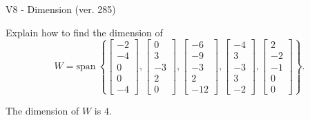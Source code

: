 \begin{exercise}
  \begin{exerciseTitle}V8 - Dimension (ver. 285)\end{exerciseTitle}
  \begin{exerciseStatement}
    Explain how to find the dimension of 
\[W=\mathrm{span}\ \left\{\left[\begin{array}{r}
-2 \\
-4 \\
0 \\
0 \\
-4
\end{array}\right] , \left[\begin{array}{r}
0 \\
3 \\
-3 \\
2 \\
0
\end{array}\right] , \left[\begin{array}{r}
-6 \\
-9 \\
-3 \\
2 \\
-12
\end{array}\right] , \left[\begin{array}{r}
-4 \\
3 \\
-3 \\
3 \\
-2
\end{array}\right] , \left[\begin{array}{r}
2 \\
-2 \\
-1 \\
0 \\
0
\end{array}\right]\right\}.\]



  \end{exerciseStatement}
  \begin{exerciseAnswer}
   The dimension of \(W\) is  \(4\).
  


  \end{exerciseAnswer}
\end{exercise}
